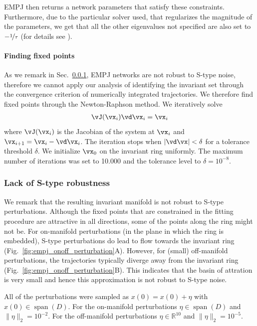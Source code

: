 \documentclass{article} %
\newcounter{ct}
\newcommand{\reals}{\mathbb{R}}
\theoremstyle{definition}
\theoremstyle{remark}
\begin{document}
EMPJ then returns a network parameters that satisfy these constraints. Furthermore, due to the particular solver used, that regularizes the magnitude of the parameters, we get that all the other eigenvalues not specified are also set to \(-\nicefrac{1}{\tau}\) (for details see \citep{pollock2020}).






\paragraph{Finding fixed points}
As we remark in Sec.~\ref{sec:empjnonrobust}, EMPJ networks are not robust to S-type noise, therefore we cannot apply our analysis of identifying the invariant set through the convergence criterion of numerically integrated trajectories.
We therefore find fixed points through the Newton-Raphson method.
We iteratively solve
\begin{align}
 \vJ(\vx_{i})\vd\vx_{i} = \vx_{i}
\end{align}
where \(\vJ(\vx_{i})\) is the Jacobian of the system at \(\vx_{i}\) and \(\vx_{i + 1}=\vx_{i}-\vd\vx_{i}\).
The iteration stops when \(|\vd\vx|<\delta\) for a tolerance threshold \(\delta\).
We initialize \(\vx_{0}\) on the invariant ring uniformly.
The maximum number of iterations was set to 10.000 and the tolerance level to \(\delta = 10^{-8}\).

\subsubsection{Lack of S-type robustness}\label{sec:empjnonrobust}
We remark that the resulting invariant manifold is not robust to S-type perturbations.
Although the fixed points that are constrained in the fitting procedure are attractive in all directions, some of the points along the ring might not be.
For on-manifold perturbations (in the plane in which the ring is embedded), S-type perturbations do lead to flow towards the invariant ring (Fig.~\ref{fig:empj_onoff_perturbation}A).
However, for (small) off-manifold perturbations, the trajectories typically diverge away from the invariant ring (Fig.~\ref{fig:empj_onoff_perturbation}B).
This indicates that the basin of attration is very small and hence this approximation is not robust to S-type noise.


All of the perturbations were sampled as
\(x(0) = x(0) + \eta\) with \(x(0)\in \operatorname{span}(D)\).
For the on-manifold perturbations \(\eta\in \operatorname{span}(D)\)  and \(\|\eta\|_{2} = 10^{-2}\).
For the off-manifold perturbations \(\eta\in \reals^{10}\) and \(\|\eta\|_{2} = 10^{-5}\).
\end{document}

